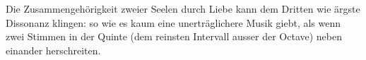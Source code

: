Die Zusammengehörigkeit zweier Seelen durch Liebe kann dem Dritten wie ärgste Dissonanz klingen: so wie es kaum eine unerträglichere Musik giebt, als wenn zwei Stimmen in der Quinte (dem reinsten Intervall ausser der Octave) neben einander herschreiten.
\par

